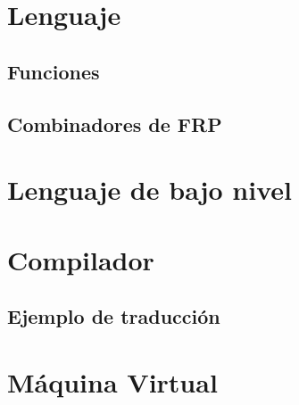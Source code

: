 


\section{Lenguaje \frob{}}


  \subsection{Funciones}
  
  \subsection{Combinadores de FRP}
  

\section{Lenguaje de bajo nivel}


\section{Compilador}

\subsection{Ejemplo de traducción}


\section{Máquina Virtual}



